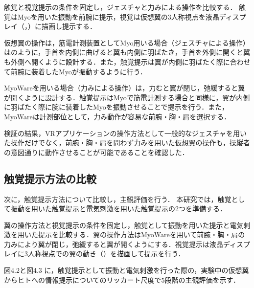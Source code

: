         触覚と視覚提示の条件を固定し，ジェスチャと力みによる操作を比較する． 触覚はMyoを用いた振動を前腕に提示，視覚は仮想翼の3人称視点を液晶ディスプレイ（，）に描画し提示する．

        仮想翼の操作は，筋電計測装置としてMyo用いる場合（ジェスチャによる操作）はのように，手首を内側に曲げると翼も内側に羽ばたき，手首を外側に開くと翼も外側へ開くように設計する．また，触覚提示は翼が内側に羽ばたく際に合わせて前腕に装着したMyoが振動するように行う．
        
        MyoWareを用いる場合（力みによる操作）は，力むと翼が閉じ，弛緩すると翼が開くように設計する．触覚提示はMyoで筋電計測する場合と同様に，翼が内側に羽ばたく際に腕に装着したMyoを振動させることで提示を行う．また，MyoWareは計測部位として，力み動作が容易な前腕・胸・肩を選択する．

        検証の結果，VRアプリケーションの操作方法として一般的なジェスチャを用いた操作だけでなく，前腕・胸・肩を問わず力みを用いた仮想翼の操作も，操縦者の意図通りに動作させることが可能であることを確認した．

    \subsection{触覚提示方法の比較}
        次に，触覚提示方法について比較し，主観評価を行う．
        本研究では，触覚として振動を用いた触覚提示と電気刺激を用いた触覚提示の2つを準備する．

        翼の操作方法と視覚提示の条件を固定し，触覚として振動を用いた提示と電気刺激を用いた提示を比較する．翼の操作方法はMyoWareを用いて前腕・胸・肩の力みにより翼が閉じ，弛緩すると翼が開くようにする．視覚提示は液晶ディスプレイに3人称視点での翼の動き（）を描画して提示を行う．

        図4.2と図4.3
        に，触覚提示として振動と電気刺激を行った際の，実験中の仮想翼からヒトへの情報提示についてのリッカート尺度で5段階の主観評価を示す．

